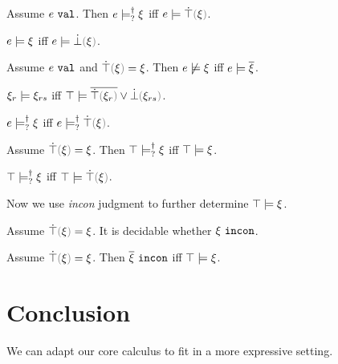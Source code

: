 \documentclass[runningheads,envcountsame,a4paper]{llncs}
\begin{document}
\begin{lemma}
  Assume $e ~\mathtt{val}$. Then $e \models_{?}^{\dag} \xi$ iff $\csatisfy{e}{\ctruify{\xi}}$.
\end{lemma}

\begin{lemma}
  $e \models \xi$ iff $\csatisfy{e}{\cfalsify{\xi}}$.
\end{lemma}

\begin{lemma}
  Assume $e ~\mathtt{val}$ and $\ctruify{\xi}=\xi$. Then $e \not\models \xi$ iff $e \models \overline{\xi}$.
\end{lemma}

\begin{theorem}
  $\xi_r \models \xi_{rs}$ iff $\csatisfy{\ctruth}{\cor{\cdual{\ctruify{\xi_r}}}{\cfalsify{\xi_{rs}}}}$.
\end{theorem}

\begin{lemma}
  $e \models_{?}^{\dag} \xi$ iff $\csatisfyormay{e}{\ctruify{\xi}}$.
\end{lemma}

\begin{lemma}
  Assume $\ctruify{\xi}=\xi$. Then $\top \models_{?}^{\dag} \xi$ iff $\top \models \xi$.
\end{lemma}

\begin{theorem}
  $\top \models_{?}^{\dag} \xi$ iff $\csatisfy{\ctruth}{\ctruify{\xi}}$.
\end{theorem}

Now we use \textit{incon} judgment to further determine $\top \models \xi$.



\begin{theorem}
  Assume $\ctruify{\xi}=\xi$. It is decidable whether $\xi ~\mathtt{incon}$.
\end{theorem}

\begin{theorem}
  Assume $\ctruify{\xi}=\xi$. Then $\overline{\xi} ~\mathtt{incon}$ iff $\top \models \xi$.
\end{theorem}
\section{Conclusion}
We can adapt our core calculus to fit in a more expressive setting.
\clearpage



\end{document}
